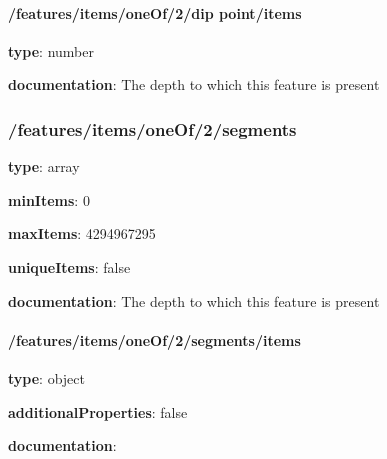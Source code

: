 \begin{itemized}
\paragraph{/features/items/oneOf/2/dip point/items} \begin{itemized}
\item {\bf type}: number
\end{itemized}\item {\bf documentation}: The depth to which this feature is present
\end{itemized}\subsubsection{/features/items/oneOf/2/segments} \begin{itemized}
\item {\bf type}: array
\item {\bf minItems}: 0
\item {\bf maxItems}: 4294967295
\item {\bf uniqueItems}: false
\item {\bf documentation}: The depth to which this feature is present
\paragraph{/features/items/oneOf/2/segments/items} \begin{itemized}
\item {\bf type}: object
\item {\bf additionalProperties}: false
\item {\bf documentation}: 
\end{itemized}\end{itemized}
